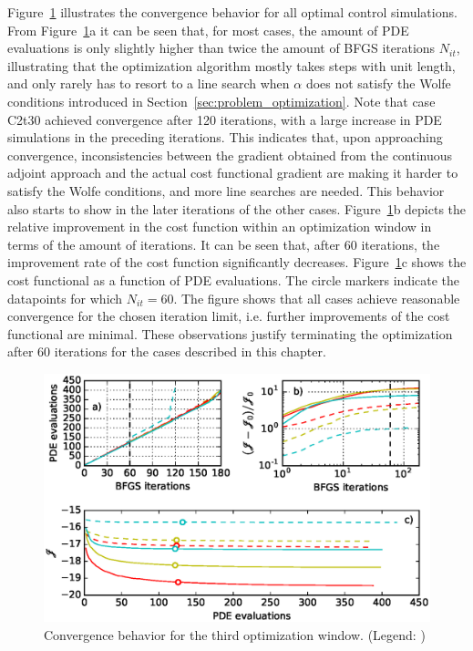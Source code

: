 Figure~\ref{fig:window_opt} illustrates the convergence behavior for all optimal control simulations. From Figure~\ref{fig:window_opt}a it can be seen that, for most cases, the amount of PDE evaluations is only slightly higher than twice the amount of BFGS iterations $N_{it}$, illustrating that the optimization algorithm mostly takes steps with unit length, and only rarely has to resort to a line search when $\alpha$ does not satisfy the Wolfe conditions introduced in Section~\ref{sec:problem_optimization}. Note that case C2t30 achieved convergence after 120 iterations, with a large increase in PDE simulations in the preceding iterations. This indicates that, upon approaching convergence, inconsistencies between the gradient obtained from the continuous adjoint approach and the actual cost functional gradient are making it harder to satisfy the Wolfe conditions, and more line searches are needed. This behavior also starts to show in the later iterations of the other cases. Figure~\ref{fig:window_opt}b depicts the relative improvement in the cost function within an optimization window in terms of the amount of iterations. It can be seen that, after 60 iterations, the improvement rate of the cost function significantly decreases. Figure~\ref{fig:window_opt}c shows the cost functional as a function of PDE evaluations. The circle markers indicate the datapoints for which $N_{it} = 60$. The figure shows that all cases achieve reasonable convergence for the chosen iteration limit, i.e. further improvements of the cost functional are minimal. These observations justify terminating the optimization after 60 iterations for the cases described in this chapter. 

\begin{figure}
	\centering
	\includegraphics[width=0.9\linewidth]{chapters/philtrans_torque/figure11.eps}
	\caption{Convergence behavior for the third optimization window. (Legend: \legendnoref) \label{fig:window_opt}}
\end{figure}
	

